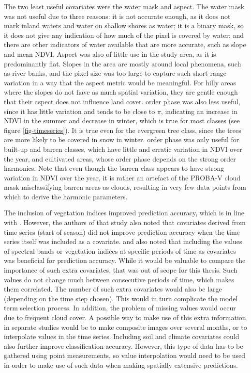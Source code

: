 \documentclass[a4paper,12pt]{scrbook}
\begin{document}
The two least useful covariates were the water mask and aspect. The water mask was not useful due to three reasons: it is not accurate enough, as it does not mark inland waters and water on shallow shores as water; it is a binary mask, so it does not give any indication of how much of the pixel is covered by water; and there are other indicators of water available that are more accurate, such as slope and mean NDVI. Aspect was also of little use in the study area, as it is predominantly flat. Slopes in the area are mostly around local phenomena, such as river banks, and the pixel size was too large to capture such short-range variation in a way that the aspect metric would be meaningful. For hilly areas where the slopes do not have as much spatial variation, they are gentle enough that their aspect does not influence land cover.  order phase was also less useful, since it has little variation and tends to be close to $\pi{}$, indicating an increase in NDVI in the summer and decrease in winter, which is true for most classes (see figure \ref{fig-timeseries}). It is true even for the evergreen tree class, since the trees are more likely to be covered in snow in winter.  order phase was only useful for built-up and barren classes, which have little and erratic variation in NDVI over the year, and cultivated areas, whose  order phase depends on the strong  order harmonics. Note that even though the barren class appears to have strong variation in NDVI over the year, it is rather an artefact of the PROBA-V cloud mask misclassifying barren areas as clouds, resulting in very few data points from which to derive the harmonic parameters.

The inclusion of vegetation indices improved prediction accuracy, which is in line with \citet{Pelletier2016hardrf}. However, the authors of that study also noted that covariates derived from time series (start of season) did not improve prediction accuracy when the time series itself was included as a covariate. \citet{davranche2010wetland} and \citet{dong2014lswi} also noted that including the values of spectral bands or vegetation indices at specific periods of time as covariates was beneficial for prediction accuracy. While it would be valuable to compare the importance of such extra covariates, that was out of scope for this thesis. Such values do not change much between consecutive periods of time, which makes them correlated. The number of such extra covariates would also be large (depending on the time step chosen). This would in turn complicate the model term selection process. In addition, the problem of missing values would occur due to frequent cloud cover. A possible way to make use of this extra information in separate studies would be to make composite images over several months, or to interpolate values in the time series. Including soil and climate covariates could also further improve classification accuracy. However, this type of data has to be gathered using point measurements, so value interpolation would need to be used in order to make use of such data when making spatially extensive predictions.
\end{document}
